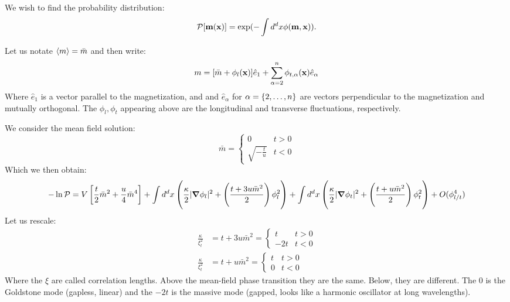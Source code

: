 We wish to find the probability distribution:
\begin{equation}
    \mathcal{P}[\mathbf{m}(\mathbf{x})] = \exp(-\int d^dx \phi(\mathbf{m}, \mathbf{x})).
\end{equation}

Let us notate $\left< m \right> = \bar{m}$ and then write:
\begin{equation}
    m = [\bar{m} + \phi_l(\mathbf{x})]\hat{e}_1 + \sum_{\alpha=2}^n \phi_{t, \alpha}(\mathbf{x})\hat{e}_\alpha
\end{equation}
Where $\hat{e}_1$ is a vector parallel to the magnetization, and and $\hat{e}_\alpha$ for $\alpha = \set{2, \ldots, n}$ are vectors perpendicular to the magnetization and mutually orthogonal. The $\phi_l, \phi_t$ appearing above are the longitudinal and transverse fluctuations, respectively.

We consider the mean field solution:
\begin{equation}
    \bar{m} = \begin{cases}
    0 & t > 0
    \\ \sqrt{-\frac{t}{u}} & t < 0
    \end{cases}
\end{equation}
Which we then obtain:
\begin{equation}
    -\ln \mathcal{P} = V\left[\frac{t}{2}\bar{m}^2 + \frac{u}{4}\bar{m}^4\right] + \int d^dx \left(\frac{\kappa}{2}\abs{\nabla \phi_l}^2 + \left(\frac{t + 3u\bar{m}^2}{2}\right)\phi_l^2\right) + \int d^dx \left(\frac{\kappa}{2}\abs{\nabla \phi_t}^2 + \left(\frac{t + u\bar{m}^2}{2}\right)\phi_t^2\right) + O(\phi_{l/t}^4)
\end{equation}
Let us rescale:
\begin{subequations}
    \begin{align}
        \frac{\kappa}{\xi_l^2} &= t + 3u\bar{m}^2 = \begin{cases}
            t & t > 0
            \\ -2t & t < 0
        \end{cases}
        \\ \frac{\kappa}{\xi_t^2} &= t + u\bar{m}^2 = \begin{cases}
            t & t > 0
            \\ 0 & t < 0
        \end{cases}
    \end{align}
\end{subequations}
Where the $\xi$ are called correlation lengths. Above the mean-field phase transition they are the same. Below, they are different. The $0$ is the Goldstone mode (gapless, linear) and the $-2t$ is the massive mode (gapped, looks like a harmonic oscillator at long wavelengths).

